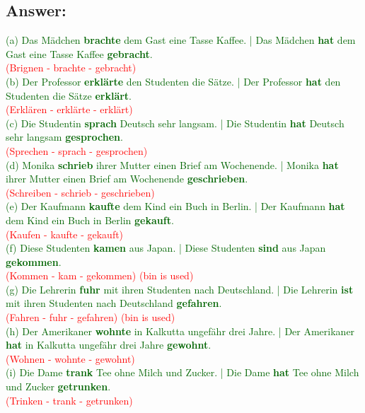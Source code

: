 \documentclass[a4paper,12pt]{article}
\begin{document}
\subsection*{Answer:}
\textcolor{darkgreen}{(a) Das Mädchen \textbf{brachte} dem Gast eine Tasse Kaffee. | Das Mädchen \textbf{hat} dem Gast eine Tasse Kaffee \textbf{gebracht}.}\\ \textcolor{red}{(Brignen - brachte - gebracht)}\\
\textcolor{darkgreen}{(b) Der Professor \textbf{erklärte} den Studenten die Sätze. | Der Professor \textbf{hat} den Studenten die Sätze \textbf{erklärt}.}\\ \textcolor{red}{(Erklären - erklärte - erklärt)}\\
\textcolor{darkgreen}{(c) Die Studentin \textbf{sprach} Deutsch sehr langsam. | Die Studentin \textbf{hat} Deutsch sehr langsam \textbf{gesprochen}.}\\ \textcolor{red}{(Sprechen - sprach - gesprochen)}\\
\textcolor{darkgreen}{(d) Monika \textbf{schrieb} ihrer Mutter einen Brief am Wochenende. | Monika \textbf{hat} ihrer Mutter einen Brief am Wochenende \textbf{geschrieben}.}\\ \textcolor{red}{(Schreiben - schrieb - geschrieben)}\\
\textcolor{darkgreen}{(e) Der Kaufmann \textbf{kaufte} dem Kind ein Buch in Berlin. | Der Kaufmann \textbf{hat} dem Kind ein Buch in Berlin \textbf{gekauft}.}\\ \textcolor{red}{(Kaufen - kaufte - gekauft)}\\
\textcolor{darkgreen}{(f) Diese Studenten \textbf{kamen} aus Japan. | Diese Studenten \textbf{sind} aus Japan \textbf{gekommen}.}\\ \textcolor{red}{(Kommen - kam - gekommen) (bin is used)}\\
\textcolor{darkgreen}{(g) Die Lehrerin \textbf{fuhr} mit ihren Studenten nach Deutschland. | Die Lehrerin \textbf{ist} mit ihren Studenten nach Deutschland \textbf{gefahren}.}\\ \textcolor{red}{(Fahren - fuhr - gefahren) (bin is used)}\\
\textcolor{darkgreen}{(h) Der Amerikaner \textbf{wohnte} in Kalkutta ungefähr drei Jahre. | Der Amerikaner \textbf{hat} in Kalkutta ungefähr drei Jahre \textbf{gewohnt}.}\\ \textcolor{red}{(Wohnen - wohnte - gewohnt)}\\
\textcolor{darkgreen}{(i) Die Dame \textbf{trank} Tee ohne Milch und Zucker. | Die Dame \textbf{hat} Tee ohne Milch und Zucker \textbf{getrunken}.}\\ \textcolor{red}{(Trinken - trank - getrunken)}\\
\end{document}
